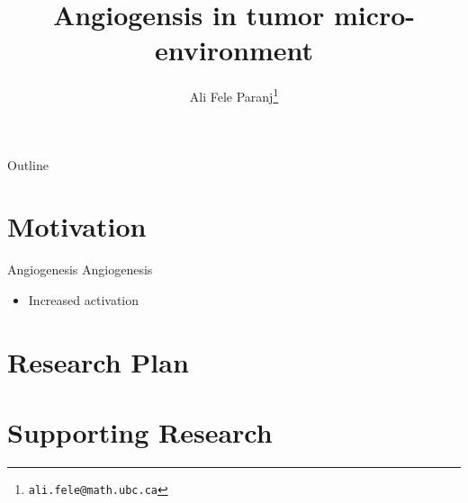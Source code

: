 \documentclass{beamer}
\title{Angiogensis in tumor micro-environment}
\author{Ali Fele Paranj\footnote{\texttt{ali.fele@math.ubc.ca}}}
\begin{document}
\begin{frame}
  \maketitle
\end{frame}

\begin{frame}{Outline}
  \tableofcontents
\end{frame}


\section{Motivation}
\begin{frame}{Angiogenesis}
	Angiogenesis 
	\begin{itemize}
		\item Increased activation
	\end{itemize}
\end{frame}

\section{Research Plan}
\section{Supporting Research}

%
%
%
%
%  
%
%
%
%
%
%
%
%
%
\end{document}
